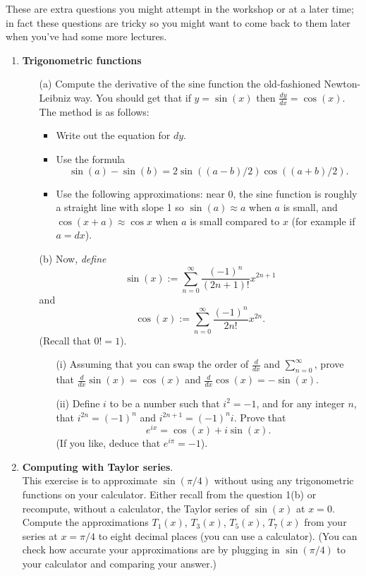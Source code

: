 \documentclass[11pt,a4paper]{scrartcl}
\begin{document}
These are extra questions you might attempt in the workshop or at a
later time; in fact these questions are tricky so you might want to
come back to them later when you've had some more lectures.

\begin{enumerate}


	\item \textbf{Trigonometric functions}
	\begin{itemize}
		\item[(a)] Compute the derivative of the sine function the 
			old-fashioned Newton-Leibniz way.
			You should get that if $y = \sin (x)$ then $\frac{dy}{dx} = \cos (x)$.
			The method is as follows:
			\begin{itemize}
				\item Write out the equation for $dy$.
				\item Use the formula
				$$\sin(a) - \sin(b) = 2\sin((a-b)/2)\cos((a+b)/2).$$
				\item Use the following approximations: near 0, 
					the sine function is roughly a straight line with slope 1
					so $\sin(a) \approx a$ when $a$ is small, and
					$\cos(x+a) \approx \cos x$ 
					when $a$ is small compared to $x$ (for example if $a = dx$).
			\end{itemize}
		\item[(b)] Now, \emph{define} 
			\[\sin(x) := \sum_{n = 0}^{\infty} \frac{(-1)^n}{(2n+1)!}x^{2n+1} \]
			and
			\[\cos(x) := \sum_{n = 0}^{\infty} \frac{(-1)^n}{2n !} x^{2n}.\]
			(Recall that $0! = 1$).
			\begin{itemize}
				\item[(i)] Assuming that you can swap the order of 
				$\frac{d}{dx}$ and $\sum_{n=0}^\infty$, 
				prove that $\frac{d}{dx} \sin(x) = \cos (x)$ 
				and $\frac{d}{dx} \cos(x) = -\sin(x)$.
				\item[(ii)] Define $i$ to be a number such that $i^2 = -1$, 
				and for any integer $n$, that $i^{2n} = (-1)^n$ and $i^{2n+1} = (-1)^n i$.
				Prove that 
				\[e^{ix} = \cos (x) + i \sin(x).\]
				(If you like, deduce that $e^{i\pi} = -1$).
			\end{itemize}
	\end{itemize}
	
	\item \textbf{Computing with Taylor series}.\\
	This exercise is to approximate $\sin(\pi/4)$ without 
	using any trigonometric functions on your calculator.
 	Either recall from the question 1(b) or recompute, without a calculator, 
 	the Taylor series of
		$\sin (x)$ at $x=0$.
		Compute the approximations $T_1(x)$, $T_3(x)$, $T_5(x)$, $T_7(x)$ from your
		series at $x = \pi/4$ to eight decimal places (you can use a calculator).
		(You can check how accurate your approximations are by plugging in 
		$\sin(\pi/4)$ to your calculator and comparing your answer.)
	

  
\end{enumerate}
\end{document}
